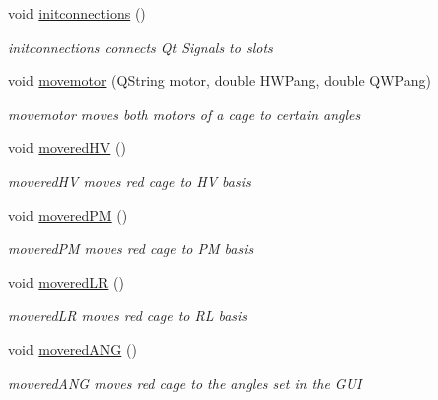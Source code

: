\begin{DoxyCompactItemize}
void \hyperlink{classcagecontrol_a56c01018dbd0d16a360106c438539c9e}{initconnections} ()
\begin{DoxyCompactList}\small\item\em initconnections connects Qt Signals to slots \end{DoxyCompactList}\item 
void \hyperlink{classcagecontrol_a4e2c79dc05f66b2b15ae01eaa8d39fca}{movemotor} (Q\+String motor, double H\+W\+Pang, double Q\+W\+Pang)
\begin{DoxyCompactList}\small\item\em movemotor moves both motors of a cage to certain angles \end{DoxyCompactList}\item 
\mbox{\label{classcagecontrol_acb242e48298555a31dcff17bff83b885}} 
void \hyperlink{classcagecontrol_acb242e48298555a31dcff17bff83b885}{movered\+HV} ()
\begin{DoxyCompactList}\small\item\em movered\+HV moves red cage to HV basis \end{DoxyCompactList}\item 
\mbox{\label{classcagecontrol_ac0a1c61636bd51739426e43efd488620}} 
void \hyperlink{classcagecontrol_ac0a1c61636bd51739426e43efd488620}{movered\+PM} ()
\begin{DoxyCompactList}\small\item\em movered\+PM moves red cage to PM basis \end{DoxyCompactList}\item 
\mbox{\label{classcagecontrol_a231f0b4dd0ab808172edc9655c5cd508}} 
void \hyperlink{classcagecontrol_a231f0b4dd0ab808172edc9655c5cd508}{movered\+LR} ()
\begin{DoxyCompactList}\small\item\em movered\+LR moves red cage to RL basis \end{DoxyCompactList}\item 
\mbox{\label{classcagecontrol_a2fc1b98fb22ede9c62c72dec1a228727}} 
void \hyperlink{classcagecontrol_a2fc1b98fb22ede9c62c72dec1a228727}{movered\+A\+NG} ()
\begin{DoxyCompactList}\small\item\em movered\+A\+NG moves red cage to the angles set in the G\+UI \end{DoxyCompactList}\item 

\end{DoxyCompactItemize}
